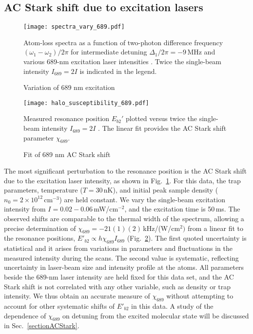 \subsection{AC Stark shift due to excitation lasers}

\begin{figure} \label{Fig:SpectraVarying689Intensity}
\centerline{
  \texttt{[image: spectra\_vary\_689.pdf]}}
  \caption{Variation of 689 nm excitation}{Atom-loss spectra as a function of two-photon difference frequency $(\omega_1-\omega_2)/2\pi$ for intermediate detuning $\Delta_1/2\pi=-9$\,MHz and various 689-nm excitation laser intensities . Twice the single-beam intensity $I_{689}=2I$ is indicated in the legend.}
 
\end{figure}

\begin{figure}
\centerline{
  \texttt{[image: halo\_susceptibility\_689.pdf]}}
  \caption{Fit of 689 nm AC Stark shift}{Measured resonance position $E_{b2}'$ plotted versus twice the single-beam intensity $I_{689}=2I$ . The linear fit provides the AC Stark shift parameter $\chi_{689}$.}
  \label{Fig:ShiftWith689Intensity}
\end{figure}

The most significant perturbation to the resonance position is the AC Stark shift due to the excitation laser intensity, as shown in Fig.\ \ref{Fig:SpectraVarying689Intensity}. For this data, the trap parameters, temperature ($T=30$\,nK), and initial peak sample density ($n_0=2\times 10^{12}$\,cm$^{-3}$) are held constant. We vary the single-beam excitation intensity from $I=0.02-0.06$\,mW/cm$^{-2}$, and the excitation time is 50\,ms.
The observed shifts are comparable to the thermal width of the spectrum, allowing a precise determination of $\chi_{689}=-21(1)(2)$\,kHz/(W/cm$^{2})$ from a linear fit to the resonance positions, $E'_{b2}\propto h\chi_{689} I_{689}$ (Fig.\ \ref{Fig:ShiftWith689Intensity}). The first quoted uncertainty is statistical and it arises from variations in parameters and fluctuations in the measured intensity during the scans. The second value is systematic, reflecting uncertainty in laser-beam size and intensity profile at the atoms. All parameters beside the 689-nm laser intensity are held fixed for this data set, and the AC Stark shift is not correlated with any other variable, such as density or trap intensity. We thus obtain an accurate measure of $\chi_{689}$ without attempting to account for other systematic shifts of $E'_{b2}$ in this data. A study of the dependence of $\chi_{689}$ on detuning from the excited molecular state
will be discussed in Sec.\ \ref{sectionACStark}.

